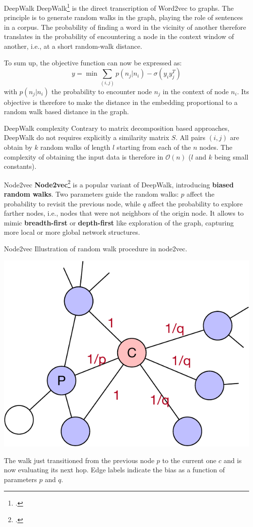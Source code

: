 \documentclass[a4paper,11pt]{book}
\begin{document}
\begin{textbox}{DeepWalk}
DeepWalk\footcite{perozzi2014deepwalk} is the direct transcription of Word2vec to graphs. The principle is to generate random walks in the graph, playing the role of sentences in a corpus. The probability of finding a word in the vicinity of another therefore translates in the probability of encountering a node in the context window of another, i.e., at a short random-walk distance.

To sum up, the objective function can now be expressed as:
\[
y=\min \sum_{(i,j)} p(n_j|n_i)-\sigma(y_i y_j^T)
\]
with $p(n_j|n_i)$ the probability to encounter node $n_j$ in the context of node $n_i$. Its objective is therefore to make the distance in the embedding proportional to a random walk based distance in the graph.
\end{textbox}

\begin{textbox}{DeepWalk complexity}
Contrary to matrix decomposition based approaches, DeepWalk do not requires explicitly a similarity matrix $S$. All pairs $(i,j)$ are obtain by $k$ random walks of length $l$ starting from each of the $n$ nodes. The complexity of obtaining the input data is therefore in $\mathcal{O}(n)$ ($l$ and $k$ being small constants).
\end{textbox}

\begin{textbox}{Node2vec}
\textbf{Node2vec}\footcite{grover2016node2vec} is a popular variant of DeepWalk, introducing \textbf{biased random walks}. Two parameters guide the random walks: $p$ affect the probability to revisit the previous node, while $q$ affect the probability to explore farther nodes, i.e., nodes that were not neighbors of the origin node. It allows to mimic \textbf{breadth-first} or \textbf{depth-first} like exploration of the graph, capturing more local or more global network structures.
\end{textbox}

\begin{textbox}{Node2vec}
Illustration of random walk procedure in node2vec. 

\centering
\includegraphics[width=0.6\linewidth]{pics/n2v.pdf}


The walk just transitioned from the previous node $p$ to the current one $c$ and is now evaluating its next hop. Edge labels indicate the bias as a function of parameters $p$ and $q$.
\end{textbox}
\end{document}
